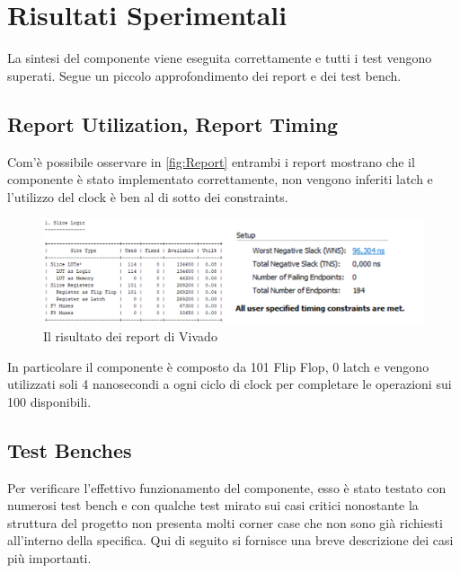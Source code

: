 \chapter{Risultati Sperimentali}
La sintesi del componente viene eseguita correttamente e tutti i test vengono superati. Segue un piccolo approfondimento dei report e dei test bench.
\section{Report Utilization, Report Timing}
Com'è possibile osservare in \autoref{fig:Report} entrambi i report mostrano che il componente è stato implementato correttamente, non vengono inferiti latch e l'utilizzo del clock è ben al di sotto dei constraints.

\begin{figure}[!htb]
    \includegraphics[keepaspectratio=true,scale=0.4]{images/Capitolo3/report.png}
    \caption{Il risultato dei report di Vivado}
    \label{fig:Report}
\end{figure}

In particolare il componente è composto da 101 Flip Flop, 0 latch e vengono utilizzati soli 4 nanosecondi a ogni ciclo di clock per completare le operazioni sui 100 disponibili.

\section{Test Benches}
Per verificare l’effettivo funzionamento del componente, esso è stato testato con numerosi test bench e con qualche test mirato sui casi critici nonostante la struttura del progetto non presenta molti corner case che non sono già richiesti all'interno della specifica. Qui di seguito si fornisce una breve descrizione dei casi più importanti.
